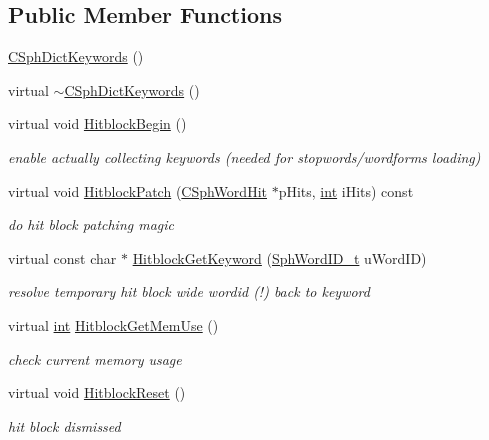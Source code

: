 \subsection*{Public Member Functions}
\begin{DoxyCompactItemize}
\item 
\hyperlink{classCSphDictKeywords_aaadbba342bb2f211c7d065909e308395}{C\-Sph\-Dict\-Keywords} ()
\item 
virtual \hyperlink{classCSphDictKeywords_a18f6cee86e4c9b40af2e5ae689b55c65}{$\sim$\-C\-Sph\-Dict\-Keywords} ()
\item 
virtual void \hyperlink{classCSphDictKeywords_a3d271d74b410172e3ea7f4d2ae0e90c2}{Hitblock\-Begin} ()
\begin{DoxyCompactList}\small\item\em enable actually collecting keywords (needed for stopwords/wordforms loading) \end{DoxyCompactList}\item 
virtual void \hyperlink{classCSphDictKeywords_a86a00591cb60035a2ed12c1f7f055b8a}{Hitblock\-Patch} (\hyperlink{structCSphWordHit}{C\-Sph\-Word\-Hit} $\ast$p\-Hits, \hyperlink{sphinxexpr_8cpp_a4a26e8f9cb8b736e0c4cbf4d16de985e}{int} i\-Hits) const 
\begin{DoxyCompactList}\small\item\em do hit block patching magic \end{DoxyCompactList}\item 
virtual const char $\ast$ \hyperlink{classCSphDictKeywords_a3afdfa74cf7783cb60c2746f8e5bf6d0}{Hitblock\-Get\-Keyword} (\hyperlink{sphinx_8h_a80a94d5984fdf9214a98f3e5e65df963}{Sph\-Word\-I\-D\-\_\-t} u\-Word\-I\-D)
\begin{DoxyCompactList}\small\item\em resolve temporary hit block wide wordid (!) back to keyword \end{DoxyCompactList}\item 
virtual \hyperlink{sphinxexpr_8cpp_a4a26e8f9cb8b736e0c4cbf4d16de985e}{int} \hyperlink{classCSphDictKeywords_a3f0b464042b7d40e19f6f792bdf3692b}{Hitblock\-Get\-Mem\-Use} ()
\begin{DoxyCompactList}\small\item\em check current memory usage \end{DoxyCompactList}\item 
virtual void \hyperlink{classCSphDictKeywords_af48256d2e25162807d705700e069dc97}{Hitblock\-Reset} ()
\begin{DoxyCompactList}\small\item\em hit block dismissed \end{DoxyCompactList}\item 

\end{DoxyCompactItemize}
